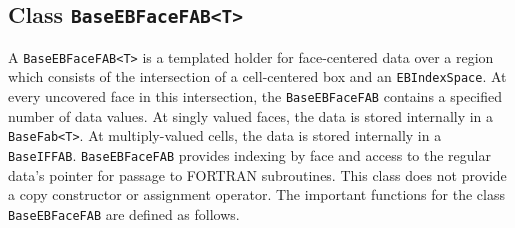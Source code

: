 \subsection{Class {\tt BaseEBFaceFAB<T>}}
\label{sec::baseebfacefab}

A {\tt BaseEBFaceFAB<T>} is a templated holder for face-centered 
data over a region
which consists of the intersection
of a cell-centered box and an {\tt EBIndexSpace}.  At every uncovered face in this 
intersection, the {\tt BaseEBFaceFAB} contains a specified number  of data
values.  At singly valued faces,
the data is stored internally in a \verb/BaseFab<T>/.  At multiply-valued
cells, the data is stored internally in a {\tt BaseIFFAB}.
{\tt BaseEBFaceFAB} provides indexing by face and access to the regular
data's pointer for passage to FORTRAN subroutines.
This class does not provide a copy constructor or assignment operator.  
The important functions for the class {\tt BaseEBFaceFAB} are defined as follows.
